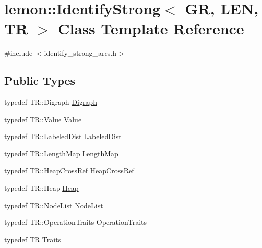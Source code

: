 \hypertarget{classlemon_1_1_identify_strong}{}\section{lemon\+:\+:Identify\+Strong$<$ GR, L\+EN, TR $>$ Class Template Reference}
\label{classlemon_1_1_identify_strong}


{\ttfamily \#include $<$identify\+\_\+strong\+\_\+arcs.\+h$>$}

\subsection*{Public Types}
\begin{DoxyCompactItemize}
\item 
typedef T\+R\+::\+Digraph \hyperlink{classlemon_1_1_identify_strong_a8cf9250557b236f81e713bf32a048d49}{Digraph}
\item 
typedef T\+R\+::\+Value \hyperlink{classlemon_1_1_identify_strong_a4f6932769928658e75abf819f960e6f1}{Value}
\item 
typedef T\+R\+::\+Labeled\+Dist \hyperlink{classlemon_1_1_identify_strong_a6b5339bd594571c5085ef41d9ddeafa0}{Labeled\+Dist}
\item 
typedef T\+R\+::\+Length\+Map \hyperlink{classlemon_1_1_identify_strong_ac2cd2d54ff91cc726fec23ff1534bd0c}{Length\+Map}
\item 
typedef T\+R\+::\+Heap\+Cross\+Ref \hyperlink{classlemon_1_1_identify_strong_a40dee7c87759955383fb3feb316435d1}{Heap\+Cross\+Ref}
\item 
typedef T\+R\+::\+Heap \hyperlink{classlemon_1_1_identify_strong_a3ba858c53d76a3df469bdd55e294cd35}{Heap}
\item 
typedef T\+R\+::\+Node\+List \hyperlink{classlemon_1_1_identify_strong_a9c68da1def7665b299ca1896f9bdd59d}{Node\+List}
\item 
typedef T\+R\+::\+Operation\+Traits \hyperlink{classlemon_1_1_identify_strong_a269ce377a01e3c77e1faf0f392751daa}{Operation\+Traits}
\item 
typedef TR \hyperlink{classlemon_1_1_identify_strong_a5cac33fc931f82c461d98ca0c16461b7}{Traits}
\end{DoxyCompactItemize}
